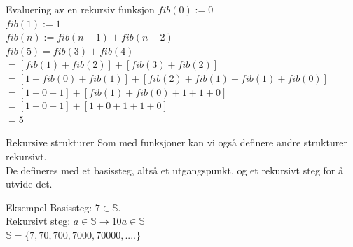 \begin{frame}{Evaluering av en rekursiv funksjon}
    $fib(0) := 0$\\
    $fib(1) := 1$\\
    $fib(n) := fib(n-1) + fib(n-2)$\\
    
    \pause
    $fib(5) = fib(3) + fib(4)$\\
    $ = [fib(1) + fib(2)] + [fib(3) + fib(2)]$\\
    $ = [1 + fib(0) + fib(1)] + [fib(2) + fib(1) + fib(1) + fib(0)]$\\
    $ = [1 + 0 + 1] + [fib(1) + fib(0) + 1 + 1 + 0]$\\
    $ = [1 + 0 + 1] + [1 + 0 + 1 + 1 + 0]$\\
    $ = 5$
\end{frame}

\begin{frame}{Rekursive strukturer}
    Som med funksjoner kan vi også definere andre strukturer rekursivt.\\
    
    De defineres med et basissteg, altså et utgangspunkt, og et rekursivt steg for å utvide det.\\
    
    \pause
    \begin{block}{Eksempel}
        Basissteg: $7 \in \mathbb{S}$.\\
        Rekursivt steg: $a \in \mathbb{S} \rightarrow 10a \in \mathbb{S}$\\
        $\mathbb{S} = \{7, 70, 700, 7000, 70000, ....\}$
    \end{block}
\end{frame}

